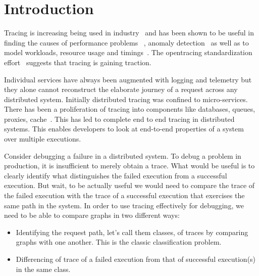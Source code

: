 \section{Introduction}
Tracing is increasing being used in industry~\cite{Jaeger, Zipkin, 36356} and has been shown to be useful in finding the causes of performance problems~ \cite{36356, Fonseca:2007:XPN:1973430.1973450, Reynolds:2006:PDU:1267680.1267689, DBLP:conf/sigmetrics/ThereskaSSWALG06, Sambasivan:2011:DPC:1972457.1972463}, anomaly detection~\cite{Barham:2003:MOM:1251054.1251069, Chen:2004:PFE:1251175.1251198, 37477, Sambasivan:2011:DPC:1972457.1972463} as well as to model workloads, resource usage and timings~\cite{Mann:2011:MPE:2170444.2170464, Chanda:2007:WTP:1272996.1273001, 36356, DBLP:conf/sigmetrics/ThereskaSSWALG06, Barham:2003:MOM:1251054.1251069}.  The opentracing standardization effort~\cite{OpenTracing} suggests that tracing is gaining traction.

Individual services have always been augmented with logging and telemetry but they alone cannot reconstruct the elaborate journey of a request across any distributed system. Initially distributed tracing was confined to micro-services. There has been a proliferation of tracing into components like databases, queues, proxies, cache~\cite{OpenTracingCassandra, OpenTracingKafka, OpenTracingRedis}. This has led to complete end to end tracing in distributed systems. This enables developers to look at end-to-end properties of a system over multiple executions.

Consider debugging a failure in a distributed system. To debug a problem in production, it is insufficient to merely obtain a trace. What would be useful is to clearly identify what distinguishes the failed execution from a successful execution. But wait, to be actually useful we would need to compare the trace of the failed execution with the trace of a successful execution that exercises the same path in the system. In order to use tracing effectively for debugging, we need to be able to compare graphs in two different ways:
\begin{itemize}
\item Identifying the request path, let's call them classes, of traces by comparing graphs with one another. This is the classic classification problem.
\item Differencing of trace of a failed execution from that of successful execution(s) in the same class.
\end{itemize}

